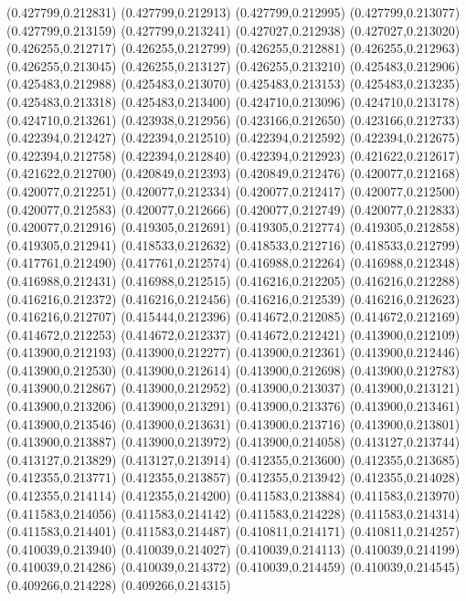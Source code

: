 (0.427799,0.212831)
(0.427799,0.212913)
(0.427799,0.212995)
(0.427799,0.213077)
(0.427799,0.213159)
(0.427799,0.213241)
(0.427027,0.212938)
(0.427027,0.213020)
(0.426255,0.212717)
(0.426255,0.212799)
(0.426255,0.212881)
(0.426255,0.212963)
(0.426255,0.213045)
(0.426255,0.213127)
(0.426255,0.213210)
(0.425483,0.212906)
(0.425483,0.212988)
(0.425483,0.213070)
(0.425483,0.213153)
(0.425483,0.213235)
(0.425483,0.213318)
(0.425483,0.213400)
(0.424710,0.213096)
(0.424710,0.213178)
(0.424710,0.213261)
(0.423938,0.212956)
(0.423166,0.212650)
(0.423166,0.212733)
(0.422394,0.212427)
(0.422394,0.212510)
(0.422394,0.212592)
(0.422394,0.212675)
(0.422394,0.212758)
(0.422394,0.212840)
(0.422394,0.212923)
(0.421622,0.212617)
(0.421622,0.212700)
(0.420849,0.212393)
(0.420849,0.212476)
(0.420077,0.212168)
(0.420077,0.212251)
(0.420077,0.212334)
(0.420077,0.212417)
(0.420077,0.212500)
(0.420077,0.212583)
(0.420077,0.212666)
(0.420077,0.212749)
(0.420077,0.212833)
(0.420077,0.212916)
(0.419305,0.212691)
(0.419305,0.212774)
(0.419305,0.212858)
(0.419305,0.212941)
(0.418533,0.212632)
(0.418533,0.212716)
(0.418533,0.212799)
(0.417761,0.212490)
(0.417761,0.212574)
(0.416988,0.212264)
(0.416988,0.212348)
(0.416988,0.212431)
(0.416988,0.212515)
(0.416216,0.212205)
(0.416216,0.212288)
(0.416216,0.212372)
(0.416216,0.212456)
(0.416216,0.212539)
(0.416216,0.212623)
(0.416216,0.212707)
(0.415444,0.212396)
(0.414672,0.212085)
(0.414672,0.212169)
(0.414672,0.212253)
(0.414672,0.212337)
(0.414672,0.212421)
(0.413900,0.212109)
(0.413900,0.212193)
(0.413900,0.212277)
(0.413900,0.212361)
(0.413900,0.212446)
(0.413900,0.212530)
(0.413900,0.212614)
(0.413900,0.212698)
(0.413900,0.212783)
(0.413900,0.212867)
(0.413900,0.212952)
(0.413900,0.213037)
(0.413900,0.213121)
(0.413900,0.213206)
(0.413900,0.213291)
(0.413900,0.213376)
(0.413900,0.213461)
(0.413900,0.213546)
(0.413900,0.213631)
(0.413900,0.213716)
(0.413900,0.213801)
(0.413900,0.213887)
(0.413900,0.213972)
(0.413900,0.214058)
(0.413127,0.213744)
(0.413127,0.213829)
(0.413127,0.213914)
(0.412355,0.213600)
(0.412355,0.213685)
(0.412355,0.213771)
(0.412355,0.213857)
(0.412355,0.213942)
(0.412355,0.214028)
(0.412355,0.214114)
(0.412355,0.214200)
(0.411583,0.213884)
(0.411583,0.213970)
(0.411583,0.214056)
(0.411583,0.214142)
(0.411583,0.214228)
(0.411583,0.214314)
(0.411583,0.214401)
(0.411583,0.214487)
(0.410811,0.214171)
(0.410811,0.214257)
(0.410039,0.213940)
(0.410039,0.214027)
(0.410039,0.214113)
(0.410039,0.214199)
(0.410039,0.214286)
(0.410039,0.214372)
(0.410039,0.214459)
(0.410039,0.214545)
(0.409266,0.214228)
(0.409266,0.214315)
